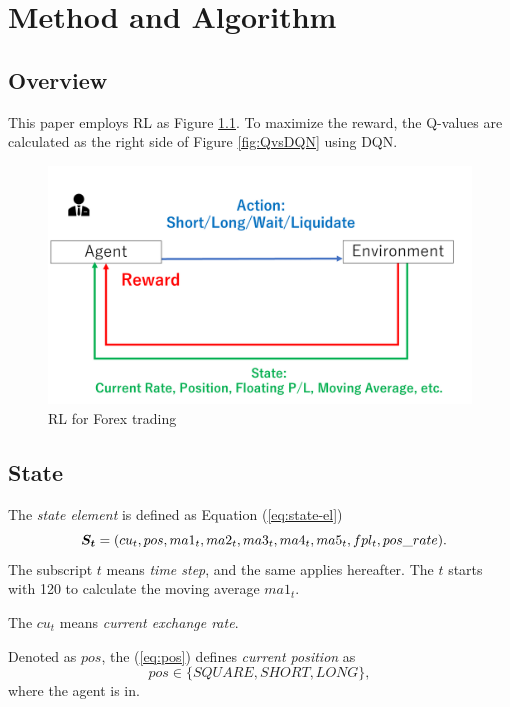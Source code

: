 \chapter{Method and Algorithm}
\label{sec:method_algo}
\section{Overview}
This paper employs RL as Figure \ref{fig:methodOverview}. To maximize the reward, the Q-values are calculated as the right side of Figure \ref{fig:QvsDQN} using DQN.
\begin{figure}[htbp]
  \centering
  \includegraphics[scale=0.4]{./Figure/method_overview.png}
  \caption{RL for Forex trading}
  \label{fig:methodOverview}
\end{figure}

\section{State}
\label{sec:state}
The {\it state element} is defined as Equation (\ref{eq:state-el}) 
\begin{equation}
  \label{eq:state-el}
\mbox{ \boldmath{ $ S_{t} $}} = (cu_{t}, pos, ma1_{t}, ma2_{t}, ma3_{t}, ma4_{t}, ma5_{t}, fpl_{t}, pos\_rate).
\end{equation}
The subscript $t$ means {\it time step}, and the same applies hereafter. The $t$ starts with 120 to calculate the moving average $ma1_{t}$.

The $cu_{t}$ means {\it current exchange rate}.

Denoted as $pos$, the (\ref{eq:pos}) defines {\it current position} as
\begin{equation}
  \label{eq:pos}
   pos \in \{ SQUARE, SHORT, LONG \},
\end{equation}
where the agent is in.

